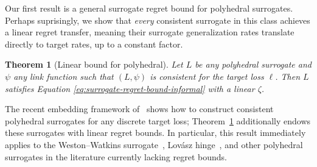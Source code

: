 \documentclass{article}
\newtheorem{theorem}{Theorem}
\theoremstyle{definition}\newtheorem{definition}{Definition}
\theoremstyle{definition}\newtheorem{assumption}{Assumption}
\newcommand{\Comments}{1}
\newcommand{\mynote}[2]{\ifnum\Comments=1\textcolor{#1}{#2}\fi}
\newcommand{\bo}[1]{\mynote{blue}{[Bo: #1]}}
\begin{document}
Our first result is a general surrogate regret bound for polyhedral surrogates.
Perhaps suprisingly, we show that \emph{every} consistent surrogate in this class achieves a linear regret transfer, meaning their surrogate generalization rates translate directly to target rates, up to a constant factor.
\begin{theorem}[Linear bound for polyhedral]
  \label{thm:main-upper}
  Let $L$ be any polyhedral surrogate and $\psi$ any link function such that $(L,\psi)$ is consistent for the target loss $\ell$.
  Then $L$ satisfies Equation \ref{eq:surrogate-regret-bound-informal} with a linear $\zeta$.
\end{theorem}
The recent embedding framework of~\citet{finocchiaro2019embedding} shows how to construct consistent polyhedral surrogates for any discrete target loss; Theorem~\ref{thm:main-upper} additionally endows these surrogates with linear regret bounds.
In particular, this result immediately applies to the Weston--Watkins surrogate~\cite{wang2020weston}, Lov\'asz hinge~\cite{yu2018lovasz,finocchiaro2019embedding}, and other polyhedral surrogates in the literature currently lacking regret bounds.
\end{document}
